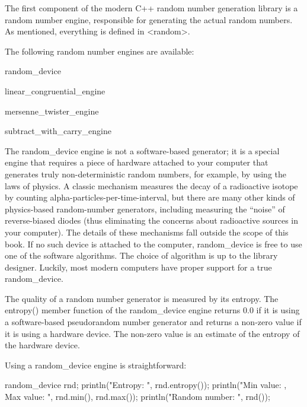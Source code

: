 The first component of the modern C++ random number generation library is a random number engine, responsible for generating the actual random numbers. As mentioned, everything is defined in <random>.

The following random number engines are available:

\begin{cpp}
random_device
\end{cpp}

\begin{cpp}
linear_congruential_engine
\end{cpp}

\begin{cpp}
mersenne_twister_engine
\end{cpp}

\begin{cpp}
subtract_with_carry_engine
\end{cpp}

The random\_device engine is not a software-based generator; it is a special engine that requires a piece of hardware attached to your computer that generates truly non-deterministic random numbers, for example, by using the laws of physics. A classic mechanism measures the decay of a radioactive isotope by counting alpha-particles-per-time-interval, but there are many other kinds of physics-based random-number generators, including measuring the “noise” of reverse-biased diodes (thus eliminating the concerns about radioactive sources in your computer). The details of these mechanisms fall outside the scope of this book. If no such device is attached to the computer, random\_device is free to use one of the software algorithms. The choice of algorithm is up to the library designer. Luckily, most modern computers have proper support for a true random\_device.

The quality of a random number generator is measured by its entropy. The entropy() member function of the random\_device engine returns 0.0 if it is using a software-based pseudorandom number generator and returns a non-zero value if it is using a hardware device. The non-zero value is an estimate of the entropy of the hardware device.

Using a random\_device engine is straightforward:

\begin{cpp}
random_device rnd;
println("Entropy: {}", rnd.entropy());
println("Min value: {}, Max value: {}", rnd.min(), rnd.max());
println("Random number: {}", rnd());
\end{cpp}

